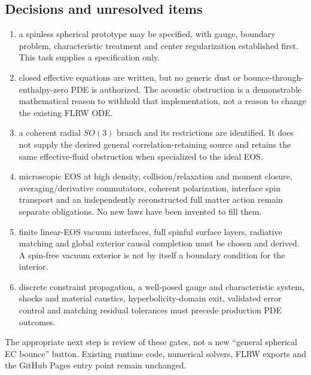 \subsection{Decisions and unresolved items}
\begin{enumerate}
 \item {} a spinless spherical prototype may be specified, with gauge, boundary problem, characteristic treatment and center regularization established first. This task supplies a specification only.
 \item {} closed effective equations are written, but no generic dust or bounce-through-enthalpy-zero PDE is authorized. The acoustic obstruction is a demonstrable mathematical reason to withhold that implementation, not a reason to change the existing FLRW ODE.
 \item {} a coherent radial $SO(3)$ branch and its restrictions are identified. It does not supply the desired general correlation-retaining source and retains the same effective-fluid obstruction when specialized to the ideal EOS.
 \item {} microscopic EOS at high density, collision/relaxation and moment closure, averaging/derivative commutators, coherent polarization, interface spin transport and an independently reconstructed full matter action remain separate obligations. No new laws have been invented to fill them.
 \item {} finite linear-EOS vacuum interfaces, full spinful surface layers, radiative matching and global exterior causal completion must be chosen and derived. A spin-free vacuum exterior is not by itself a boundary condition for the interior.
 \item {} discrete constraint propagation, a well-posed gauge and characteristic system, shocks and material caustics, hyperbolicity-domain exit, validated error control and matching residual tolerances must precede production PDE outcomes.
\end{enumerate}
The appropriate next step is review of these gates, not a new ``general spherical EC bounce'' button. Existing runtime code, numerical solvers, FLRW exports and the GitHub Pages entry point remain unchanged.
